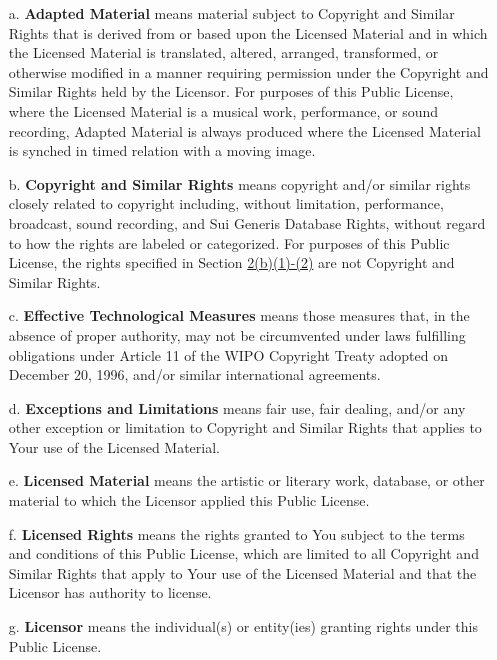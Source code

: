 \begin{itemize}
\item[a.] \textbf{Adapted Material} means material subject to Copyright and Similar Rights that is derived from or based upon the Licensed Material and in which the Licensed Material is translated, altered, arranged, transformed, or otherwise modified in a manner requiring permission under the Copyright and Similar Rights held by the Licensor. For purposes of this Public License, where the Licensed Material is a musical work, performance, or sound recording, Adapted Material is always produced where the Licensed Material is synched in timed relation with a moving image.

\item[b.] \textbf{Copyright and Similar Rights} means copyright and/or similar rights closely related to copyright including, without limitation, performance, broadcast, sound recording, and Sui Generis Database Rights, without regard to how the rights are labeled or categorized. For purposes of this Public License, the rights specified in Section \href{https://creativecommons.org/licenses/by-nc-nd/4.0/legalcode#s2b}{2(b)(1)-(2)} are not Copyright and Similar Rights.

\item[c.] \textbf{Effective Technological Measures} means those measures that, in the absence of proper authority, may not be circumvented under laws fulfilling obligations under Article 11 of the WIPO Copyright Treaty adopted on December 20, 1996, and/or similar international agreements.

\item[d.] \textbf{Exceptions and Limitations} means fair use, fair dealing, and/or any other exception or limitation to Copyright and Similar Rights that applies to Your use of the Licensed Material.

\item[e.] \textbf{Licensed Material} means the artistic or literary work, database, or other material to which the Licensor applied this Public License.

\item[f.] \textbf{Licensed Rights} means the rights granted to You subject to the terms and conditions of this Public License, which are limited to all Copyright and Similar Rights that apply to Your use of the Licensed Material and that the Licensor has authority to license.

\item[g.] \textbf{Licensor} means the individual(s) or entity(ies) granting rights under this Public License.


\end{itemize}
